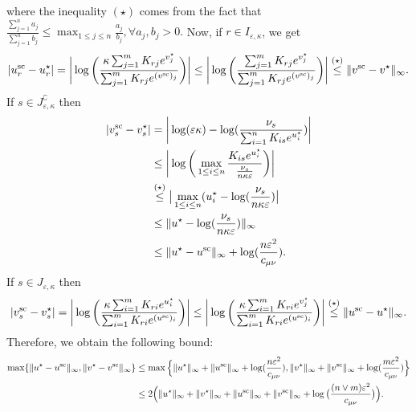 where the inequality $(\star)$ comes from the fact that $\frac{\sum_{j=1}^na_j}{\sum_{j=1}^nb_{j}} \leq \max_{1\leq j \leq n} \frac{a_j}{b_j}, \forall a_j, b_j>0.$
Now, if $r \in I_{\varepsilon, \kappa}$, we get 
\begin{align*}
|{u}^{\text{sc}}_{r} - {u}^\star_r|
= \bigg|\log\bigg(\frac{\kappa\sum_{j=1}^m K_{rj}e^{v^\star_j}}{\sum_{j=1}^m K_{rj}e^{(v^{\text{sc}})_j}}\bigg)\bigg|
\leq \bigg|\log\bigg(\frac{\sum_{j=1}^m K_{rj}e^{v^\star_j}}{\sum_{j=1}^m K_{rj}e^{(v^{\text{sc}})_j}}\bigg)\bigg|
\overset{(\star)}{\leq}\|v^{\text{sc}} - v^\star\|_\infty.
\end{align*}
If $s \in J^\complement_{\varepsilon, \kappa}$ then 
\begin{align*}
|{v}^{\text{sc}}_{s} - {v}^\star_s| &= \bigg| \log(\varepsilon\kappa) - \log(\frac{\nu_s}{\sum_{i=1}^n K_{is}e^{u^\star_i}})\bigg|\\
& \leq \bigg|\log\bigg(\max_{1\leq i \leq n} \frac{K_{is}e^{u^\star_i}}{\frac{\nu_s}{n\kappa\varepsilon}}\bigg) \bigg|\\
& \overset{(\star)}{\leq} \big|\max_{1\leq i \leq n} (u_i^\star - \log(\frac{\nu_s}{n\kappa\varepsilon})\big|\\
& \leq \|u^\star - \log(\frac{\nu_s}{n\kappa\varepsilon})\|_\infty \\
& \leq \|u^\star - u^{\text{sc}}\|_\infty +  \log(\frac{n\varepsilon^2}{c_{\mu\nu}}).
\end{align*}
If $s \in J_{\varepsilon, \kappa}$ then 
\begin{align*}
|{v}^{\text{sc}}_{s} - {v}^\star_s| 
= \bigg|\log\bigg(\frac{\kappa\sum_{i=1}^m K_{ri}e^{u^\star_i}}{\sum_{i=1}^m K_{ri}e^{(u^{\text{sc}})_i}}\bigg)\bigg|
 \leq \bigg|\log\bigg(\frac{\kappa\sum_{i=1}^m K_{ri}e^{v^\star_j}}{\sum_{i=1}^m K_{ri}e^{(u^{\text{sc}})_i}}\bigg)\bigg|
\overset{(\star)}{\leq} \|u^{\text{sc}} - u^\star\|_\infty.
\end{align*}
Therefore, we obtain the following bound:
\begin{align}
\label{induction_uppers_bounds}
\max\{\|u^\star - u^{\text{sc}}\|_\infty, \|v^\star - v^{\text{sc}}\|_\infty\} 
&\leq \max\Big\{\|u^\star\|_\infty + \|u^{\text{sc}}\|_\infty +  \log(\frac{n\varepsilon^2}{c_{\mu\nu}}), \|v^\star\|_\infty + \|v^{\text{sc}}\|_\infty + \log(\frac{m\varepsilon^2}{c_{\mu\nu}})\Big\}\nonumber\\
&\leq 2\Big(\|u^\star\|_\infty + \|v^\star\|_\infty +  \|u^{\text{sc}}\|_\infty +  \|v^{\text{sc}}\|_\infty + \log\big(\frac{(n\vee m)\varepsilon^2}{c_{\mu\nu}}\big)\Big).
\end{align}

